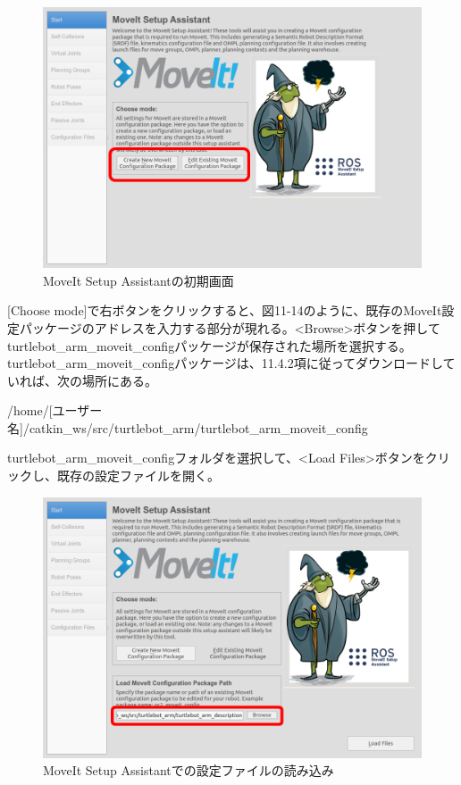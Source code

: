 \begin{figure}[htp]
  \centering
  \includegraphics[width=12cm]{pictures/chapter11/pic_11_13.png}
  \caption{MoveIt Setup Assistantの初期画面}
\end{figure}

[Choose mode]で右ボタンをクリックすると、図11-14のように、既存のMoveIt設定パッケージのアドレスを入力する部分が現れる。<Browse>ボタンを押してturtlebot\_arm\_moveit\_configパッケージが保存された場所を選択する。 turtlebot\_arm\_moveit\_configパッケージは、11.4.2項に従ってダウンロードしていれば、次の場所にある。

\vspace{\baselineskip}
/home/[ユーザー名]/catkin\_ws/src/turtlebot\_arm/turtlebot\_arm\_moveit\_config
\vspace{\baselineskip}

turtlebot\_arm\_moveit\_configフォルダを選択して、<Load Files>ボタンをクリックし、既存の設定ファイルを開く。\\

\begin{figure}[htp]
  \centering
  \includegraphics[width=12cm]{pictures/chapter11/pic_11_14.png}
  \caption{MoveIt Setup Assistantでの設定ファイルの読み込み}
\end{figure}

